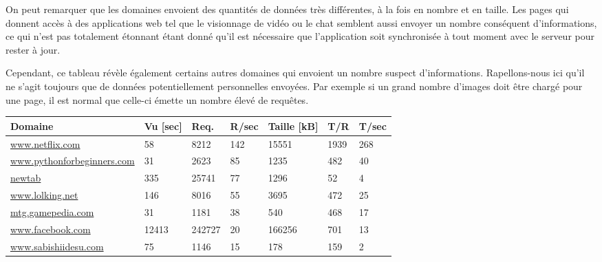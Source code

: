 			On peut remarquer que les domaines envoient des quantités de données très différentes, à la fois en nombre et en taille. Les pages qui donnent accès à des applications web tel que le visionnage de vidéo ou le chat semblent aussi envoyer un nombre conséquent d'informations, ce qui n'est pas totalement étonnant étant donné qu'il est nécessaire que l'application soit synchronisée à tout moment avec le serveur pour rester à jour.

			Cependant, ce tableau révèle également certains autres domaines qui envoient un nombre suspect d'informations. Rapellons-nous ici qu'il ne s'agit toujours que de données potentiellement personnelles envoyées. Par exemple si un grand nombre d'images doit être chargé pour une page, il est normal que celle-ci émette un nombre élevé de requêtes.

			\begin{table}[]
\centering
\begin{tabular}{lllllll}
\textbf{Domaine}           & \textbf{Vu {[}sec{]}} & \textbf{Req.} & \textbf{R/sec} & \textbf{Taille {[}kB{]}} & \textbf{T/R} & \textbf{T/sec} \\ \hline
\scriptsize \url{www.netflix.com}            & 58                    & 8212          & 142                  & 15551                    & 1939         & 268            \\
\scriptsize \url{www.pythonforbeginners.com} & 31                    & 2623          & 85                   & 1235                     & 482          & 40             \\
\scriptsize \url{newtab}                     & 335                   & 25741         & 77                   & 1296                     & 52           & 4              \\
\scriptsize \url{www.lolking.net}            & 146                   & 8016          & 55                   & 3695                     & 472          & 25             \\
\scriptsize \url{mtg.gamepedia.com}          & 31                    & 1181          & 38                   & 540                      & 468          & 17             \\
\scriptsize \url{www.facebook.com}           & 12413                 & 242727        & 20                   & 166256                   & 701          & 13             \\
\scriptsize \url{www.sabishiidesu.com}       & 75                    & 1146          & 15                   & 178                      & 159          & 2              \\

\end{tabular}
\end{table}
